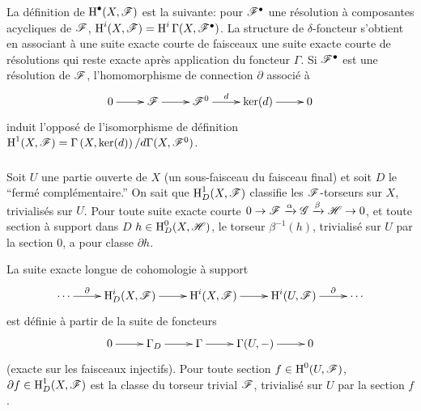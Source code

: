 \subsubsection{}\label{IV:1-1-3}

La définition de $\operatorname{H}^\bullet(X,\mathscr{F})$ est la suivante: pour $\mathscr{F}^\bullet$ une 
résolution à composantes acycliques de $\mathscr{F}$, 
$\operatorname{H}^i(X,\mathscr{F}) = \operatorname{H}^i\Gamma(X,\mathscr{F}^\bullet)$. La structure de $\delta$-foncteur 
s'obtient en associant à une suite exacte courte de faisceaux une suite 
exacte courte de résolutions qui reste exacte après application du 
foncteur $\Gamma$. Si $\mathscr{F}^\bullet$ est une résolution de $\mathscr{F}$, 
l'homomorphisme de connection $\partial$ associé à 
\[\xymatrix{
  0 \ar[r]
    & \cF \ar[r]
    & \cF^0 \ar[r]^-d 
    & \ker(d) \ar[r] 
    & 0
}\]
induit l'opposé de l'isomorphisme de définition 
$\operatorname{H}^1(X,\mathscr{F}) = \Gamma\left(X,\ker(d)\right)/d \Gamma(X,\mathscr{F}^0)$. 





\subsubsection{}\label{IV:1-1-4}

Soit $U$ une partie ouverte de $X$ (un sous-faisceau du faisceau final) et 
soit $D$ le ``fermé complémentaire.'' On sait que $\operatorname{H}_D^1(X,\mathscr{F})$ 
classifie les $\mathscr{F}$-torseurs sur $X$, trivialisés sur $U$. Pour toute suite 
exacte courte $0\to \mathscr{F}\xrightarrow\alpha \mathscr{G}\xrightarrow\beta\mathscr{H}\to 0$, et 
toute section à support dans $D$ $h\in\operatorname{H}_D^0(X,\mathscr{H})$, le torseur 
$\beta^{-1}(h)$, trivialisé sur $U$ par la section $0$, a pour classe 
$\partial h$.

La suite exacte longue de cohomologie à support
\[\xymatrix{
  \cdots \ar[r]^-\partial 
    & \h_D^i(X,\cF) \ar[r] 
    & \h^i(X,\cF) \ar[r]
    & \h^i(U,\cF) \ar[r]^-\partial 
    & \cdots
}\]
est définie à partir de la suite de foncteurs 
\[\xymatrix{
  0 \ar[r] 
    & \Gamma_D \ar[r] 
    & \Gamma \ar[r] 
    & \Gamma(U,-) \ar[r] 
    & 0
}\]
(exacte sur les faisceaux injectifs). Pour toute section $f\in \operatorname{H}^0(U,\mathscr{F})$, 
$\partial f\in \operatorname{H}_D^1(X,\mathscr{F})$ est la classe du torseur trivial $\mathscr{F}$, 
trivialisé sur $U$ par la section $f$. 





\subsubsection{}\label{IV:1-1-5}

